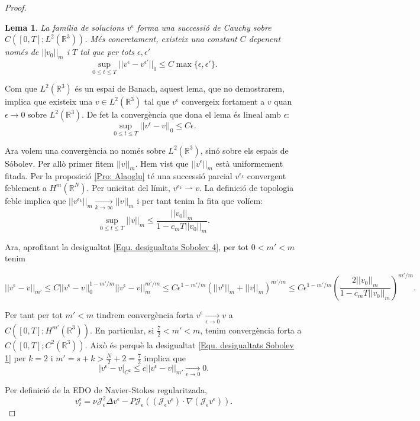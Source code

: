 \documentclass{article}
\numberwithin{equation}{section}
\newtheorem{lema}{Lema}[section]
\begin{document}
\begin{proof}
\begin{lema}
La fam\'{i}lia de solucions $v^{\epsilon}$ forma una successi\'{o} de Cauchy sobre $C([0,T];L^2(\mathbb{R}^3))$. M\'{e}s concretament, existeix una constant $C$ depenent nom\'{e}s de $||v_0||_m$ i $T$ tal que per tots $\epsilon,\epsilon'$
\[\sup_{0\leq t\leq T}||v^{\epsilon}-v^{\epsilon'}||_0\leq C\max\{\epsilon,\epsilon'\}.\]
\end{lema}

Com que $L^2(\mathbb{R}^3)$ \'{e}s un espai de Banach, aquest lema, que no demostrarem, implica que existeix una $v\in L^2(\mathbb{R}^3)$ tal que $v^{\epsilon}$ convergeix fortament a $v$ quan $\epsilon\to0$ sobre $L^2(\mathbb{R}^3)$. De fet la converg\`{e}ncia que dona el lema \'{e}s lineal amb $\epsilon$:
\[\sup_{0\leq t\leq T}||v^{\epsilon}-v||_0\leq C\epsilon.\]

Ara volem una converg\`{e}ncia no nom\'{e}s sobre $L^2(\mathbb{R}^3)$, sin\'{o} sobre els espais de S\'{o}bolev. Per all\`{o} primer fitem $||v||_m$. Hem vist que $||v^{\epsilon}||_m$ est\`{a} uniformement fitada. Per la proposici\'{o} \ref{Pro: Alaoglu} t\'{e} una successi\'{o} parcial $v^{\epsilon_k}$ convergent feblement a $H^m(\mathbb{R}^N)$. Per unicitat del l\'{i}mit, $v^{\epsilon_k}\rightharpoonup v$. La definici\'{o} de topologia feble implica que $||v^{\epsilon_k}||_m\xrightarrow[k\to\infty]{}||v||_m$ i per tant tenim la fita que vol\'{i}em:
\[\sup_{0\leq t\leq T}||v||_m\leq\frac{||v_0||_m}{1-c_mT||v_0||_m}.\]

Ara, aprofitant la desigualtat \eqref{Equ. desigualtats Sobolev 4}, per tot $0<m'<m$ tenim

\[||v^{\epsilon}-v||_{m'}\leq C||v^{\epsilon}-v||_0^{1-m'/m}||v^{\epsilon}-v||_m^{m'/m}\leq C\epsilon^{1-m'/m}(||v^{\epsilon}||_m+||v||_m)^{m'/m}\leq C\epsilon^{1-m'/m}\left(\frac{2||v_0||_m}{1-c_mT||v_0||_m}\right)^{m'/m}.\]

Per tant per tot $m'<m$ tindrem converg\`{e}ncia forta $v^{\epsilon}\xrightarrow[\epsilon\to0]{}v$ a $C([0,T];H^{m'}(\mathbb{R}^3))$. En particular, si $\frac{7}{2}<m'<m$, tenim converg\`{e}ncia forta a $C([0,T];C^2(\mathbb{R}^3))$. Aix\`{o} \'{e}s perqu\`{e} la desigualtat \eqref{Equ. desigualtats Sobolev 1} per $k=2$ i $m'=s+k>\frac{N}{2}+2=\frac{7}{2}$ implica que
\[|v^{\epsilon}-v|_{C^2}\leq c||v^{\epsilon}-v||_{m'}\xrightarrow[\epsilon\to0]{}0.\]

Per definici\'{o} de la EDO de Navier-Stokes regularitzada,
\[v_t^{\epsilon}=\nu\mathcal{J}_{\epsilon}^2\Delta v^{\epsilon}-P\mathcal{J}_{\epsilon}((\mathcal{J}_{\epsilon}v^{\epsilon})\cdot\nabla(\mathcal{J}_{\epsilon}v^{\epsilon})).\]


\end{proof}
\end{document}
